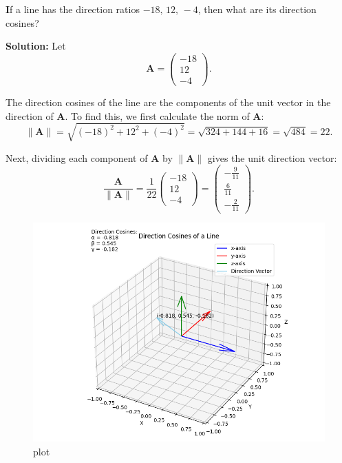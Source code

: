 \documentclass[journal]{IEEEtran}
\begin{document}
\textbf If a line has the direction ratios $-18,\, 12,\, -4$, then what are its direction cosines?

\vspace{1em}

\textbf{Solution:} Let
\[
\mathbf{A} = \begin{pmatrix}
-18 \\
12 \\
-4
\end{pmatrix}.
\]

The direction cosines of the line are the components of the unit vector in the direction of $\mathbf{A}$. To find this, we first calculate the norm of $\mathbf{A}$:
\[
\|\mathbf{A}\| = \sqrt{(-18)^2 + 12^2 + (-4)^2} = \sqrt{324 + 144 + 16} = \sqrt{484} = 22.
\]

Next, dividing each component of $\mathbf{A}$ by $\|\mathbf{A}\|$ gives the unit direction vector:
\[
\frac{\mathbf{A}}{\|\mathbf{A}\|} = \frac{1}{22} \begin{pmatrix}
-18 \\
12 \\
-4
\end{pmatrix} = \begin{pmatrix}
-\frac{9}{11} \\
\frac{6}{11} \\
-\frac{2}{11}
\end{pmatrix}.
\]




\begin{figure}[H]
    \centering
    \includegraphics[width=1\linewidth]{figs/plot.png}
    \caption{plot}
    \label{fig:placeholder}
\end{figure}
\end{document}
